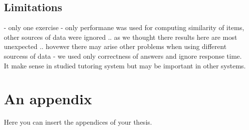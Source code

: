 \documentclass[
  digital, %
  table,   %
  nolof,     %
  nolot,     %
  nocover
]{fithesis3}
\begin{document}


\section{Limitations}\label{limitations}

- only one exercise
- only performane was used for computing similarity of items, other sources of data were ignored .. as we thought there results here are most unexpected .. hovewer there may arise other problems when using different sourcess of data
- we used only correctness of answers and ignore response time. It make sense in studied tutoring system but may be important in other systems.


  \makeatletter\thesis@blocks@clear\makeatother
  \printindex

\appendix %
\chapter{An appendix}
Here you can insert the appendices of your thesis.
\end{document}
